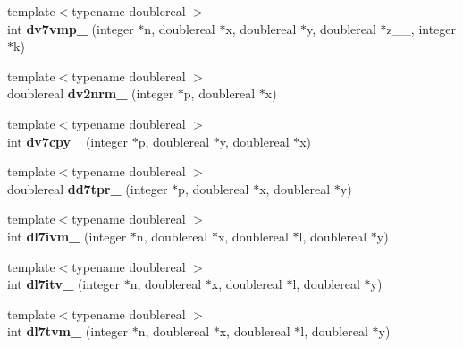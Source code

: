 \begin{DoxyCompactItemize}
\item 
\hypertarget{namespaceport_a824bd40b943c21429f920a19b602a2c8}{{\footnotesize template$<$typename doublereal $>$ }\\int {\bfseries dv7vmp\+\_\+} (integer $\ast$n, doublereal $\ast$x, doublereal $\ast$y, doublereal $\ast$z\+\_\+\+\_\+, integer $\ast$k)}\label{namespaceport_a824bd40b943c21429f920a19b602a2c8}

\item 
\hypertarget{namespaceport_a9d8d1a251aeaa9f8559aa44de28cef64}{{\footnotesize template$<$typename doublereal $>$ }\\doublereal {\bfseries dv2nrm\+\_\+} (integer $\ast$p, doublereal $\ast$x)}\label{namespaceport_a9d8d1a251aeaa9f8559aa44de28cef64}

\item 
\hypertarget{namespaceport_a5a8d1652f73ec094bbd5e17d085237da}{{\footnotesize template$<$typename doublereal $>$ }\\int {\bfseries dv7cpy\+\_\+} (integer $\ast$p, doublereal $\ast$y, doublereal $\ast$x)}\label{namespaceport_a5a8d1652f73ec094bbd5e17d085237da}

\item 
\hypertarget{namespaceport_acefb7200dcc9b551ef8350e1ad6a8953}{{\footnotesize template$<$typename doublereal $>$ }\\doublereal {\bfseries dd7tpr\+\_\+} (integer $\ast$p, doublereal $\ast$x, doublereal $\ast$y)}\label{namespaceport_acefb7200dcc9b551ef8350e1ad6a8953}

\item 
\hypertarget{namespaceport_a25860e3f501a1df994ff6164ff18d3f4}{{\footnotesize template$<$typename doublereal $>$ }\\int {\bfseries dl7ivm\+\_\+} (integer $\ast$n, doublereal $\ast$x, doublereal $\ast$l, doublereal $\ast$y)}\label{namespaceport_a25860e3f501a1df994ff6164ff18d3f4}

\item 
\hypertarget{namespaceport_a0deaaf43f1dcccbbba6de285f2909fd5}{{\footnotesize template$<$typename doublereal $>$ }\\int {\bfseries dl7itv\+\_\+} (integer $\ast$n, doublereal $\ast$x, doublereal $\ast$l, doublereal $\ast$y)}\label{namespaceport_a0deaaf43f1dcccbbba6de285f2909fd5}

\item 
\hypertarget{namespaceport_a29df76826f0b1b768f0d2e1272636808}{{\footnotesize template$<$typename doublereal $>$ }\\int {\bfseries dl7tvm\+\_\+} (integer $\ast$n, doublereal $\ast$x, doublereal $\ast$l, doublereal $\ast$y)}\label{namespaceport_a29df76826f0b1b768f0d2e1272636808}


\end{DoxyCompactItemize}
